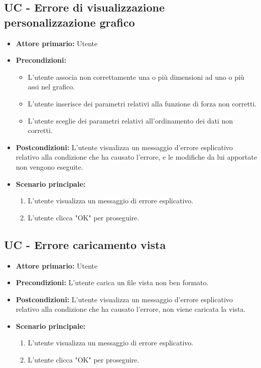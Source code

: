\subsection{UC - Errore di visualizzazione personalizzazione grafico}
\label{sec:UC - Errore di personalizzazione}
\begin{itemize}
    \item \textbf{Attore primario:} Utente
    \item \textbf{Precondizioni:}
    		\begin{itemize}
    			\item L'utente associa non correttamente una o più dimensioni ad uno o più assi nel grafico.
    			\item L'utente inserisce dei parametri relativi alla funzione di forza non corretti.
    			\item L'utente sceglie dei parametri relativi all'ordinamento dei dati non corretti.
    		\end{itemize}
    \item \textbf{Postcondizioni:} L'utente visualizza un messaggio d'errore esplicativo relativo alla condizione che ha causato l'errore, e le modifiche da lui apportate non vengono eseguite.
    \item \textbf{Scenario principale:}
    \begin{enumerate}
        \item L'utente visualizza un messaggio di errore esplicativo.
        \item L'utente clicca "OK" per proseguire.
    \end{enumerate}
\end{itemize}

\subsection{UC - Errore caricamento vista}
\label{sec:UC - Errore caricamento vista}
\begin{itemize}
    \item \textbf{Attore primario:} Utente
    \item \textbf{Precondizioni:} L'utente carica un file vista non ben formato.
    \item \textbf{Postcondizioni:} L'utente visualizza un messaggio d'errore esplicativo relativo alla condizione che ha causato l'errore, non viene caricata la vista.
    \item \textbf{Scenario principale:}
    \begin{enumerate}
        \item L'utente visualizza un messaggio di errore esplicativo.
        \item L'utente clicca "OK" per proseguire.
    \end{enumerate}
\end{itemize}
